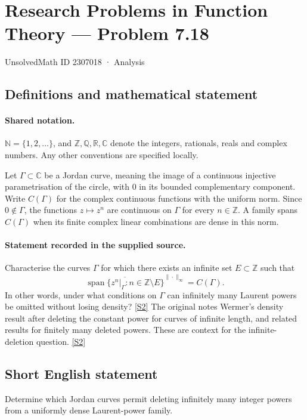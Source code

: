 \documentclass[11pt]{article}
\newcommand{\sref}[2]{\hyperlink{source:#1:#2}{[S#2]}}
\begin{document}
\setcounter{section}{2307017}
\section{Research Problems in Function Theory — Problem 7.18}\label{2307018}
{\small\sffamily UnsolvedMath ID 2307018 · Analysis}
\subsection{Definitions and mathematical statement}

\paragraph{Shared notation.}$\mathbb N=\{1,2,\ldots\}$, and $\mathbb Z,\mathbb Q,\mathbb R,\mathbb C$ denote the integers, rationals, reals and complex numbers. Any other conventions are specified locally.


Let $\Gamma\subset\mathbb C$ be a Jordan curve, meaning the image of a continuous injective parametrisation of the circle, with $0$ in its bounded complementary component. Write $C(\Gamma)$ for the complex continuous functions with the uniform norm. Since $0\notin\Gamma$, the functions $z\mapsto z^n$ are continuous on $\Gamma$ for every $n\in\mathbb Z$. A family spans $C(\Gamma)$ when its finite complex linear combinations are dense in this norm.

\paragraph{Statement recorded in the supplied source.}
Characterise the curves $\Gamma$ for which there exists an infinite set $E\subset\mathbb Z$ such that
\[\overline{\operatorname{span}\{z^n|_\Gamma:n\in\mathbb Z\setminus E\}}^{\|\cdot\|_\infty}=C(\Gamma).\]
In other words, under what conditions on $\Gamma$ can infinitely many Laurent powers be omitted without losing density? \sref{2307018}{2}
The original notes Wermer's density result after deleting the constant power for curves of infinite length, and related results for finitely many deleted powers. These are context for the infinite-deletion question. \sref{2307018}{2}
\subsection{Short English statement}
Determine which Jordan curves permit deleting infinitely many integer powers from a uniformly dense Laurent-power family.
\end{document}
